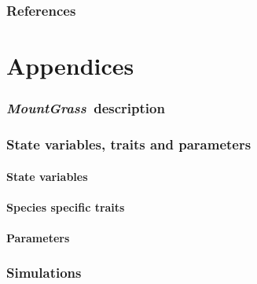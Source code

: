 \documentclass[review]{elsarticle}
\newcommand{\model}{\textbf{\textit{MountGrass}}~}
\begin{document}
\section*{References}
\cite{Dirac1953888}


\part*{Appendices}


\section{\model description}

\section{State variables, traits and parameters}
\subsection{State variables}
\subsection{Species specific traits}
\subsection{Parameters}

\section{Simulations}
\end{document}
